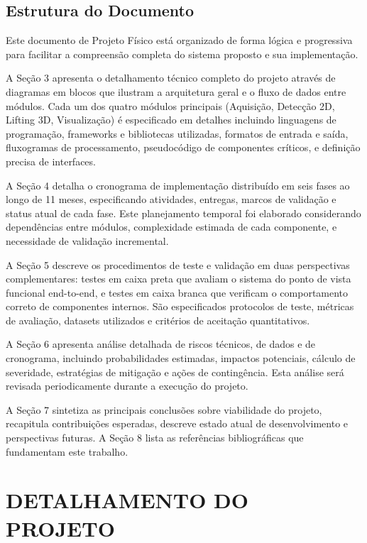 \documentclass[12pt, a4paper]{article}
\begin{document}
\subsection{Estrutura do Documento}

Este documento de Projeto Físico está organizado de forma lógica e progressiva para facilitar a compreensão completa do sistema proposto e sua implementação.

A Seção 3 apresenta o detalhamento técnico completo do projeto através de diagramas em blocos que ilustram a arquitetura geral e o fluxo de dados entre módulos. Cada um dos quatro módulos principais (Aquisição, Detecção 2D, Lifting 3D, Visualização) é especificado em detalhes incluindo linguagens de programação, frameworks e bibliotecas utilizadas, formatos de entrada e saída, fluxogramas de processamento, pseudocódigo de componentes críticos, e definição precisa de interfaces.

A Seção 4 detalha o cronograma de implementação distribuído em seis fases ao longo de 11 meses, especificando atividades, entregas, marcos de validação e status atual de cada fase. Este planejamento temporal foi elaborado considerando dependências entre módulos, complexidade estimada de cada componente, e necessidade de validação incremental.

A Seção 5 descreve os procedimentos de teste e validação em duas perspectivas complementares: testes em caixa preta que avaliam o sistema do ponto de vista funcional end-to-end, e testes em caixa branca que verificam o comportamento correto de componentes internos. São especificados protocolos de teste, métricas de avaliação, datasets utilizados e critérios de aceitação quantitativos.

A Seção 6 apresenta análise detalhada de riscos técnicos, de dados e de cronograma, incluindo probabilidades estimadas, impactos potenciais, cálculo de severidade, estratégias de mitigação e ações de contingência. Esta análise será revisada periodicamente durante a execução do projeto.

A Seção 7 sintetiza as principais conclusões sobre viabilidade do projeto, recapitula contribuições esperadas, descreve estado atual de desenvolvimento e perspectivas futuras. A Seção 8 lista as referências bibliográficas que fundamentam este trabalho.

\section{DETALHAMENTO DO PROJETO}
\end{document}
